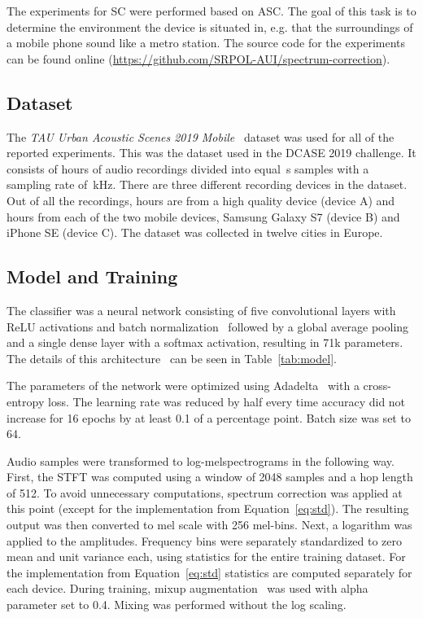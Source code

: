 \documentclass[a4paper]{article}
\newcommand{\sourcecode}{\url{https://github.com/SRPOL-AUI/spectrum-correction}}
\begin{document}
The experiments for SC were performed based on ASC. The goal of this task is to determine the environment the device is situated in, e.g. that the surroundings of a mobile phone sound like a metro station. The source code for the experiments can be found online (\sourcecode).


\subsection{Dataset}
\label{ssec:dataset}

The \textit{TAU Urban Acoustic Scenes 2019 Mobile}~\cite{dcase} dataset was used for all of the reported experiments.  This was the dataset used in the DCASE 2019 challenge. It consists of  hours of audio recordings divided into equal \,s samples with a sampling rate of \,kHz. There are three different recording devices in the dataset. Out of all the recordings,  hours are from a high quality device (device A) and  hours from each of the two mobile devices, Samsung Galaxy S7 (device B) and iPhone SE (device C). The dataset was collected in twelve cities in Europe. 

\subsection{Model and Training}
\label{ssec:model-training}

The classifier was a neural network consisting of five convolutional layers with ReLU activations and batch normalization~\cite{batch-norm} followed by a global average pooling and a single dense layer with a softmax activation, resulting in 71k parameters. The details of this architecture~\cite{Komider2019} can be seen in Table~\ref{tab:model}.

The parameters of the network were optimized using Adadelta~\cite{adadelta} with a cross-entropy loss. The learning rate was reduced by half every time accuracy did not increase for 16 epochs by at least 0.1 of a percentage point. Batch size was set to 64.

Audio samples were transformed to log-melspectrograms in the following way. First, the STFT was computed using a window of 2048 samples and a hop length of 512. To avoid unnecessary computations, spectrum correction was applied at this point (except for the implementation from Equation~\eqref{eq:std}). The resulting output was then converted to mel scale with 256 mel-bins. Next, a logarithm was applied to the amplitudes.
Frequency bins were separately standardized to zero mean and unit variance each, using statistics for the entire training dataset. For the implementation from Equation~\eqref{eq:std} statistics are computed separately for each device.
During training, mixup augmentation~\cite{mixup} was used with alpha parameter set to 0.4. Mixing was performed without the log scaling. 
\end{document}
